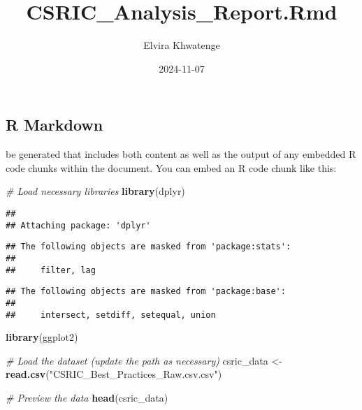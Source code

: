 \documentclass[
]{article}
\title{CSRIC\_Analysis\_Report.Rmd}
\author{Elvira Khwatenge}
\date{2024-11-07}
\newenvironment{Shaded}{\begin{snugshade}}{\end{snugshade}}
\newcommand{\CommentTok}[1]{\textcolor[rgb]{0.56,0.35,0.01}{\textit{#1}}}
\newcommand{\FunctionTok}[1]{\textcolor[rgb]{0.13,0.29,0.53}{\textbf{#1}}}
\newcommand{\NormalTok}[1]{#1}
\newcommand{\OtherTok}[1]{\textcolor[rgb]{0.56,0.35,0.01}{#1}}
\newcommand{\StringTok}[1]{\textcolor[rgb]{0.31,0.60,0.02}{#1}}
\begin{document}
\maketitle

\hypertarget{r-markdown}{%
\subsection{R Markdown}\label{r-markdown}}

be generated that includes both content as well as the output of any
embedded R code chunks within the document. You can embed an R code
chunk like this:

\begin{Shaded}
\begin{Highlighting}[]
\CommentTok{\# Load necessary libraries}
\FunctionTok{library}\NormalTok{(dplyr)}
\end{Highlighting}
\end{Shaded}

\begin{verbatim}
## 
## Attaching package: 'dplyr'
\end{verbatim}

\begin{verbatim}
## The following objects are masked from 'package:stats':
## 
##     filter, lag
\end{verbatim}

\begin{verbatim}
## The following objects are masked from 'package:base':
## 
##     intersect, setdiff, setequal, union
\end{verbatim}

\begin{Shaded}
\begin{Highlighting}[]
\FunctionTok{library}\NormalTok{(ggplot2)}

\CommentTok{\# Load the dataset (update the path as necessary)}
\NormalTok{csric\_data }\OtherTok{\textless{}{-}} \FunctionTok{read.csv}\NormalTok{(}\StringTok{"CSRIC\_Best\_Practices\_Raw.csv.csv"}\NormalTok{)}

\CommentTok{\# Preview the data}
\FunctionTok{head}\NormalTok{(csric\_data)}
\end{Highlighting}
\end{Shaded}
\end{document}
